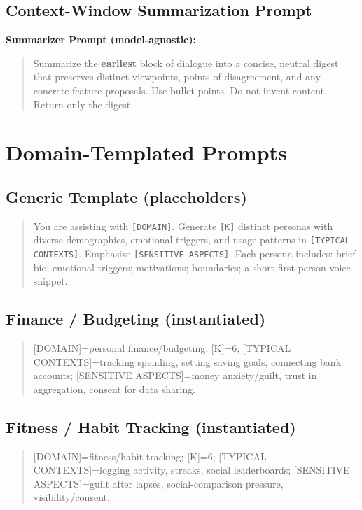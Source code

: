 \documentclass[acmsmall]{acmart}
\begin{document}
\subsection{Context-Window Summarization Prompt}
\noindent\textbf{Summarizer Prompt (model-agnostic):}
\begin{quote}\small
Summarize the \textbf{earliest} block of dialogue into a concise, neutral digest that preserves distinct viewpoints, points of disagreement, and any concrete feature proposals. 
Use bullet points. Do not invent content. Return only the digest.
\end{quote}

\section{Domain-Templated Prompts}

\subsection{Generic Template (placeholders)}
\begin{quote}\small
You are assisting with \texttt{[DOMAIN]}. Generate \texttt{[K]} distinct personas with diverse demographics, emotional triggers, and usage patterns in \texttt{[TYPICAL CONTEXTS]}. 
Emphasize \texttt{[SENSITIVE ASPECTS]}. Each persona includes: brief bio; emotional triggers; motivations; boundaries; a short first-person voice snippet.
\end{quote}

\subsection{Finance / Budgeting (instantiated)}
\begin{quote}\small
[DOMAIN]=personal finance/budgeting; [K]=6; [TYPICAL CONTEXTS]=tracking spending, setting saving goals, connecting bank accounts; 
[SENSITIVE ASPECTS]=money anxiety/guilt, trust in aggregation, consent for data sharing.
\end{quote}

\subsection{Fitness / Habit Tracking (instantiated)}
\begin{quote}\small
[DOMAIN]=fitness/habit tracking; [K]=6; [TYPICAL CONTEXTS]=logging activity, streaks, social leaderboards; 
[SENSITIVE ASPECTS]=guilt after lapses, social-comparison pressure, visibility/consent.
\end{quote}
\end{document}
